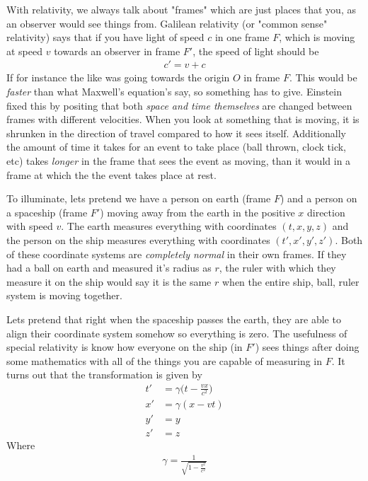 With relativity, we always talk about "frames" which are just places that you, as an observer would see things from. Galilean relativity (or "common sense" relativity) says that if you have light of speed $c$ in one frame $F$, which is moving at speed $v$ towards an observer in frame $F'$, the speed of light should be 
\begin{align}
    c' = v+ c
\end{align}
If for instance the like was going towards the origin $O$ in frame $F$. This would be \emph{faster} than what Maxwell's equation's say, so something has to give. Einstein fixed this by positing that both \emph{space and time themselves} are changed between frames with different velocities. When you look at something that is moving, it is shrunken in the direction of travel compared to how it sees itself. Additionally the amount of time it takes for an event to take place (ball thrown, clock tick, etc) takes \emph{longer} in the frame that sees the event as moving, than it would in a frame at which the the event takes place at rest. 


To illuminate, lets pretend we have a person on earth (frame $F$) and a person on a spaceship (frame $F'$) moving away from the earth in the positive $x$ direction with speed $v$. The earth measures everything with coordinates $(t,x,y,z)$ and the person on the ship measures everything with coordinates $(t',x',y',z')$. Both of these coordinate systems are \emph{completely normal} in their own frames. If they had a ball on earth and measured it's radius as $r$, the ruler with which they measure it on the ship would say it is the same $r$ when the entire ship, ball, ruler system is moving together. 

Lets pretend that right when the spaceship passes the earth, they are able to align their coordinate system somehow so everything is zero. The usefulness of special relativity is know how everyone on the ship (in $F'$) sees things after doing some mathematics with all of the things you are capable of measuring in $F$. It turns out that the transformation is given by %
\begin{align}\label{lorentzcontract}
    t' &= \gamma\Big(t -\frac{vx}{c^2} \Big)\\
    x' &= \gamma(x - vt)\\
    y' &= y\\
    z' &= z
\end{align}
Where 
\begin{align}
\gamma =\frac{1}{ \sqrt{1-\frac{v^2}{c^2}}  }
\end{align}

